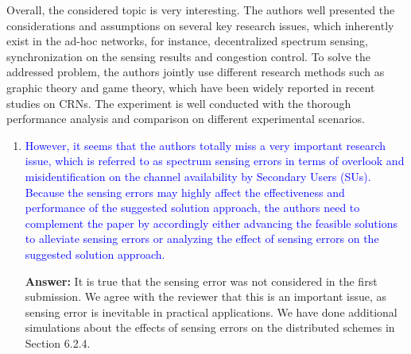 \documentclass[10pt,a4paper]{article}
\begin{document}
Overall, the considered topic is very interesting. The authors well presented the considerations and assumptions on several key research issues, which inherently exist in the ad-hoc networks, for instance, decentralized spectrum sensing, synchronization on the sensing results and congestion control. To solve the addressed problem, the authors jointly use different research methods such as graphic theory and game theory, which have been widely reported in recent studies on CRNs. The experiment is well conducted with the thorough performance analysis and comparison on different experimental scenarios.
\begin{enumerate}
\item \textcolor{blue}{ However, it seems that the authors totally miss a very important research issue, which is referred to as spectrum sensing errors in terms of overlook and misidentification on the channel availability by Secondary Users (SUs). Because the sensing errors may highly affect the effectiveness and performance of the suggested solution approach, the authors need to complement the paper by accordingly either advancing the feasible solutions to alleviate sensing errors or analyzing the effect of sensing errors on the suggested solution approach.}

 \textbf{Answer:} It is true that the sensing error was not considered in the first submission.
We agree with the reviewer that this is an important issue, as sensing error is inevitable in practical applications.
We have done additional simulations about the effects of sensing errors on the distributed schemes in Section 6.2.4.
\end{enumerate}

%


\end{document}
